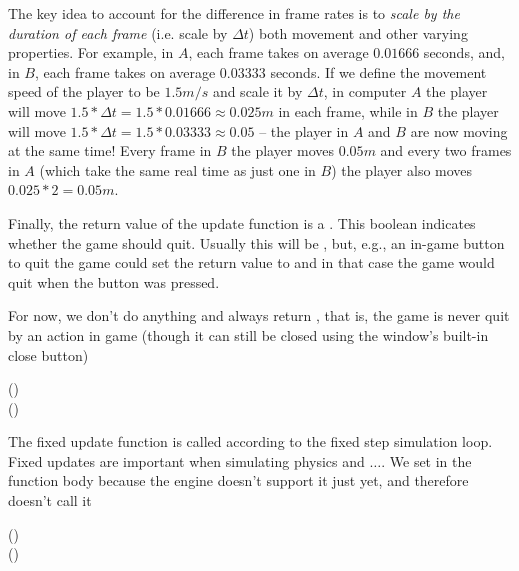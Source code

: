 The key idea to account for the difference in frame rates is to \emph{scale by
the duration of each frame} (i.e. scale by $\Delta t$) both movement and other
varying properties. For example, in $A$, each frame takes on average $0.01666$
seconds, and, in $B$, each frame takes on average $0.03333$ seconds.  If we
define the movement speed of the player to be $1.5m/s$ and scale it by $\Delta
t$, in computer $A$ the player will move $1.5*\Delta t = 1.5*0.01666 \approx
0.025m$ in each frame, while in $B$ the player will move $1.5*\Delta t =
1.5*0.03333 \approx 0.05$ -- the player in $A$ and $B$ are now moving at the
same time! Every frame in $B$ the player moves $0.05m$ and every two frames in
$A$ (which take the same real time as just one in $B$) the player also moves
$0.025*2 = 0.05m$. 

Finally, the return value of the update function is a . This boolean
indicates whether the game should quit. Usually this will be , but,
e.g., an in-game button to quit the game could set the return value to 
and in that case the game would quit when the button was pressed.

For now, we don't do anything and always return , that is, the game is
never quit by an action in game (though it can still be closed using the
window's built-in close button)

\begin{hscode}\SaveRestoreHook
{}%
%
\>[B]{}\mathbin{::}()\to {}\to {}\;\<[E]%
\\
\>[B]{}\;()\;\mathrel{=}\;\<[E]%
\ColumnHook
\end{hscode}\resethooks

The fixed update function is called according to the fixed step
simulation loop. Fixed updates are important when simulating physics and $\dots$.
We set  in the function body because the engine doesn't support it
just yet, and therefore doesn't call it

\begin{hscode}\SaveRestoreHook
{}%
%
\>[B]{}\mathbin{::}()\to {}\to {}\;\<[E]%
\\
\>[B]{}\;()\;\mathrel{=}\;\<[E]%
\ColumnHook
\end{hscode}\resethooks

